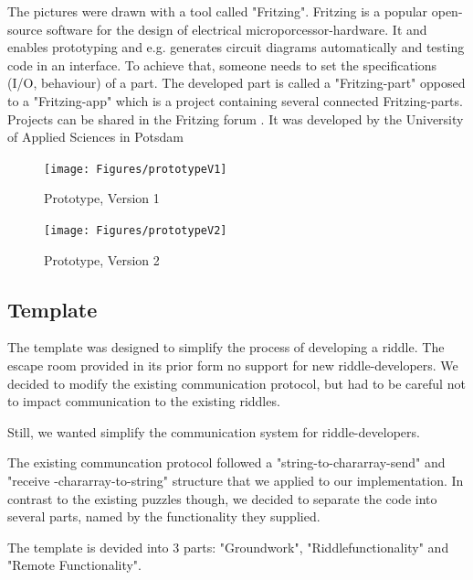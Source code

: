The pictures were drawn with a tool called "Fritzing". 
Fritzing is a popular open-source software for the design of electrical microporcessor-hardware.
It and enables prototyping and e.g. generates circuit diagrams automatically and testing code in an interface. 
To achieve that, someone needs to set the specifications (I/O, behaviour) of a part. 
The developed part is called a "Fritzing-part" opposed to a "Fritzing-app" which is a project containing several connected Fritzing-parts. 
Projects can be shared in the Fritzing forum \parencite{fritzingForum}. It was developed by the University of Applied Sciences in Potsdam

\begin{figure}[H]
	\centering
	\texttt{[image: Figures/prototypeV1]}
	\decoRule
	\caption[First Version of the Prototype]{Prototype, Version 1}
	\label{fig:prototypeV1}
\end{figure}


\begin{figure}[H]
	\centering
	\texttt{[image: Figures/prototypeV2]}
	\decoRule
	\caption[Second Version of the Prototype]{Prototype, Version 2}
	\label{fig:prototypeV2}
\end{figure}

\subsection{Template}

The template was designed to simplify the process of developing a riddle.
The escape room provided in its prior form no support for new riddle-developers.
We decided to modify the existing communication protocol, 
but had to be careful not to impact communication to the existing riddles.

Still, we wanted simplify the communication system for riddle-developers.

The existing communcation protocol followed a "string-to-chararray-send" and "receive -chararray-to-string" structure that we applied to our implementation.
In contrast to the existing puzzles though, we decided to separate the code into several parts, named by the functionality they supplied.

The template is devided into 3 parts: "Groundwork", "Riddlefunctionality" and "Remote Functionality".


